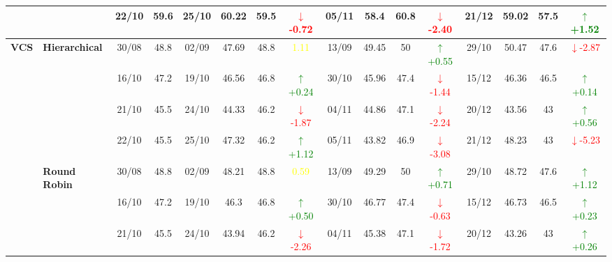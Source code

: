\documentclass{ieeeaccess}
\begin{document}
{\begin{longtable}{llcc|cccc|cccc|cccc}
&
& 22/10 & 59.6 & 25/10 & 60.22 & 59.5 & \textcolor{red}{\(\downarrow\)-0.72} & 05/11 & 58.4 & 60.8 & \textcolor{red}{\(\downarrow\)-2.40} & 21/12 & 59.02 & 57.5 & \textcolor{green}{\(\uparrow\)+1.52} \\
\midrule



\multirow{12}{*}{\textbf{VCS}} 
& \textbf{Hierarchical}
& 30/08 & 48.8 & 02/09 & 47.69 & 48.8 & \textcolor{yellow}{1.11} & 13/09 & 49.45 & 50 & \textcolor{green}{\(\uparrow\)+0.55} & 29/10 & 50.47 & 47.6 & \textcolor{red}{\(\downarrow\)-2.87} \\

&
& 16/10 & 47.2 & 19/10 & 46.56 & 46.8 & \textcolor{green}{\(\uparrow\)+0.24} & 30/10 & 45.96 & 47.4 & \textcolor{red}{\(\downarrow\)-1.44} & 15/12 & 46.36 & 46.5 & \textcolor{green}{\(\uparrow\)+0.14} \\

&
& 21/10 & 45.5 & 24/10 & 44.33 & 46.2 & \textcolor{red}{\(\downarrow\)-1.87} & 04/11 & 44.86 & 47.1 & \textcolor{red}{\(\downarrow\)-2.24} & 20/12 & 43.56 & 43 & \textcolor{green}{\(\uparrow\)+0.56} \\

&
& 22/10 & 45.5 & 25/10 & 47.32 & 46.2 & \textcolor{green}{\(\uparrow\)+1.12} & 05/11 & 43.82 & 46.9 & \textcolor{red}{\(\downarrow\)-3.08} & 21/12 & 48.23 & 43 & \textcolor{red}{\(\downarrow\)-5.23} \\
\cmidrule(lr){2-16}


& \textbf{Round Robin}
& 30/08 & 48.8 & 02/09 & 48.21 & 48.8 & \textcolor{yellow}{0.59} & 13/09 & 49.29 & 50 & \textcolor{green}{\(\uparrow\)+0.71} & 29/10 & 48.72 & 47.6 & \textcolor{green}{\(\uparrow\)+1.12} \\

&
& 16/10 & 47.2 & 19/10 & 46.3 & 46.8 & \textcolor{green}{\(\uparrow\)+0.50} & 30/10 & 46.77 & 47.4 & \textcolor{red}{\(\downarrow\)-0.63} & 15/12 & 46.73 & 46.5 & \textcolor{green}{\(\uparrow\)+0.23} \\

&
& 21/10 & 45.5 & 24/10 & 43.94 & 46.2 & \textcolor{red}{\(\downarrow\)-2.26} & 04/11 & 45.38 & 47.1 & \textcolor{red}{\(\downarrow\)-1.72} & 20/12 & 43.26 & 43 & \textcolor{green}{\(\uparrow\)+0.26} \\


\end{longtable}}
\end{document}

